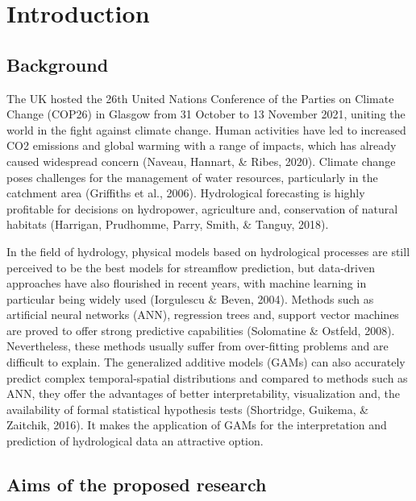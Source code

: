 \documentclass[12pt,oneside]{reedthesis}
\begin{document}
\mainmatter %
\pagestyle{fancyplain} %

\hypertarget{intro}{%
\chapter{Introduction}\label{intro}}

\hypertarget{background}{%
\section{Background}\label{background}}

The UK hosted the 26th United Nations Conference of the Parties on Climate Change (COP26) in Glasgow from 31 October to 13 November 2021, uniting the world in the fight against climate change. Human activities have led to increased CO2 emissions and global warming with a range of impacts, which has already caused widespread concern (Naveau, Hannart, \& Ribes, 2020). Climate change poses challenges for the management of water resources, particularly in the catchment area (Griffiths et al., 2006). Hydrological forecasting is highly profitable for decisions on hydropower, agriculture and, conservation of natural habitats (Harrigan, Prudhomme, Parry, Smith, \& Tanguy, 2018).

In the field of hydrology, physical models based on hydrological processes are still perceived to be the best models for streamflow prediction, but data-driven approaches have also flourished in recent years, with machine learning in particular being widely used (Iorgulescu \& Beven, 2004). Methods such as artificial neural networks (ANN), regression trees and, support vector machines are proved to offer strong predictive capabilities (Solomatine \& Ostfeld, 2008). Nevertheless, these methods usually suffer from over-fitting problems and are difficult to explain. The generalized additive models (GAMs) can also accurately predict complex temporal-spatial distributions and compared to methods such as ANN, they offer the advantages of better interpretability, visualization and, the availability of formal statistical hypothesis tests (Shortridge, Guikema, \& Zaitchik, 2016). It makes the application of GAMs for the interpretation and prediction of hydrological data an attractive option.

\hypertarget{aims-of-the-proposed-research}{%
\section{Aims of the proposed research}\label{aims-of-the-proposed-research}}
\end{document}
